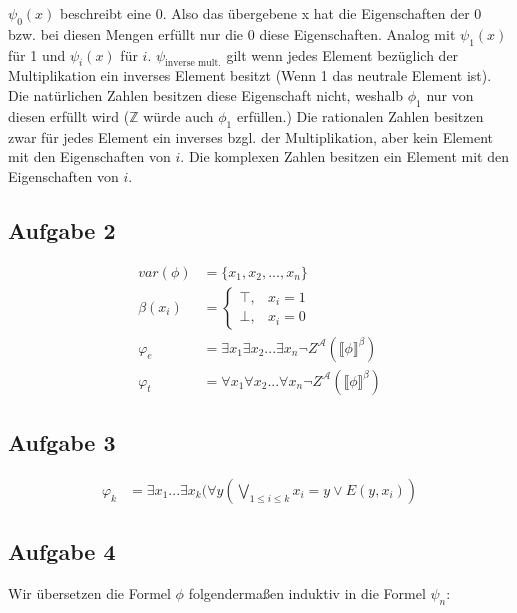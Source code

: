 \documentclass[a4paper,10pt]{article}
\begin{document}
\begin{enumerate}[(i)]
$\psi_0(x)$ beschreibt eine 0. Also das übergebene x hat die Eigenschaften der 0 bzw. bei diesen Mengen erfüllt nur die 0 diese Eigenschaften. Analog mit $\psi_1(x)$ für 1 und $\psi_i(x)$ für $i$. $\psi_{\text{inverse mult.}}$ gilt wenn jedes Element bezüglich der Multiplikation ein inverses Element besitzt (Wenn 1 das neutrale Element ist). Die natürlichen Zahlen besitzen diese Eigenschaft nicht, weshalb $\phi_1$ nur von diesen erfüllt wird ($\mathbb{Z}$ würde auch $\phi_1$ erfüllen.)
Die rationalen Zahlen besitzen zwar für jedes Element ein inverses bzgl. der Multiplikation, aber kein Element mit den Eigenschaften von $i$. Die komplexen Zahlen besitzen ein Element mit den Eigenschaften von $i$.
\end{enumerate}

\subsection*{Aufgabe 2}
\begin{align*}
	var(\phi) &= \{x_1,x_2,...,x_n\} \\
	\beta(x_i) &= 
	\begin{cases}
	\top, & x_i = 1 \\
	\bot, & x_i = 0
	\end{cases} \\
	\varphi_e &= \exists x_1 \exists x_2 ...\exists x_n \neg Z^{\mathcal{A}}( \llbracket \phi \rrbracket^{\beta}) \\
	\varphi_t &= \forall x_1 \forall x_2 ...\forall x_n \neg Z^{\mathcal{A}}( \llbracket \phi \rrbracket^{\beta})
\end{align*}

\subsection*{Aufgabe 3}
\begin{align*}
	\varphi_k &= \exists x_1...\exists x_k(\forall y( \bigvee_{1 \le i \le k} x_i = y \lor E(y,x_i))
\end{align*}

\subsection*{Aufgabe 4}

Wir übersetzen die Formel $\phi$ folgendermaßen induktiv in die Formel $\psi_n$:
\end{document}
